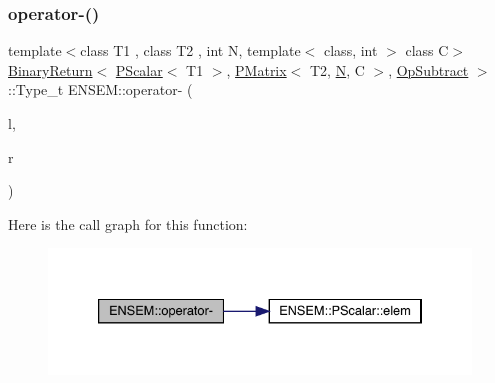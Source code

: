 \subsubsection{\texorpdfstring{operator-\/()}{operator-()}\hspace{0.1cm}{\footnotesize\ttfamily [4/4]}}
{\footnotesize\ttfamily template$<$class T1 , class T2 , int N, template$<$ class, int $>$ class C$>$ \\
\mbox{\hyperlink{structENSEM_1_1BinaryReturn}{Binary\+Return}}$<$ \mbox{\hyperlink{classENSEM_1_1PScalar}{P\+Scalar}}$<$ T1 $>$, \mbox{\hyperlink{classENSEM_1_1PMatrix}{P\+Matrix}}$<$ T2, \mbox{\hyperlink{operator__name__util_8cc_a7722c8ecbb62d99aee7ce68b1752f337}{N}}, C $>$, \mbox{\hyperlink{structENSEM_1_1OpSubtract}{Op\+Subtract}} $>$\+::Type\+\_\+t E\+N\+S\+E\+M\+::operator-\/ (\begin{DoxyParamCaption}\item[{const \mbox{\hyperlink{classENSEM_1_1PScalar}{P\+Scalar}}$<$ T1 $>$ \&}]{l,  }\item[{const \mbox{\hyperlink{classENSEM_1_1PMatrix}{P\+Matrix}}$<$ T2, \mbox{\hyperlink{operator__name__util_8cc_a7722c8ecbb62d99aee7ce68b1752f337}{N}}, C $>$ \&}]{r }\end{DoxyParamCaption})\hspace{0.3cm}{\ttfamily [inline]}}

Here is the call graph for this function\+:\nopagebreak
\begin{figure}[H]
\begin{center}
\leavevmode
\includegraphics[width=333pt]{df/d0a/group__primmatrix_ga6f60741d61098ca196a5f733f86a5835_cgraph}
\end{center}
\end{figure}
\mbox{\label{group__primmatrix_ga1b00e76a765453dfbb33f0630bd863c3}} 
